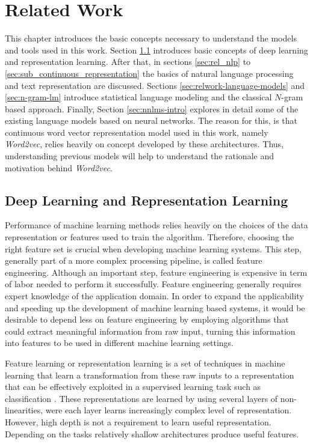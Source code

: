 
\chapter{Related Work}
\label{chap:related_work}

This chapter introduces the basic concepts necessary to understand the models
and tools  used in this work. Section \ref{sec:deep_learning} introduces
basic concepts of deep learning and representation learning. After that, in
sections  \ref{sec:rel_nlp} to \ref{sec:sub_continuous_representation}
the basics of natural language processing and text representation  are
discussed. Sections \ref{sec:relwork-language-models} and \ref{sec:n-gram-lm} introduce statistical
language modeling and the classical $N$-gram based approach. Finally,
Section \ref{sec:nnlms-intro} explores 
  in detail some of the existing language  models based
on neural networks. The reason for this, is that continuous word vector
representation model used in this work, namely \textit{Word2vec}, relies
heavily on concept developed by these architectures. Thus, understanding  previous models  will help to understand the rationale and
motivation behind \textit{Word2vec}. 
\section{Deep Learning and Representation Learning}
 \label{sec:deep_learning}
Performance of machine learning methods relies heavily on the choices of the
data representation or features used to train the algorithm. Therefore,
choosing the right feature set is crucial when developing  machine learning
 systems. This step, generally part of a more complex processing
pipeline, is called feature engineering.
Although an important step, feature engineering is expensive in term of labor needed
to perform it successfully. Feature engineering generally requires   expert
knowledge of the application domain.  In order to expand the applicability
and speeding up the development of machine learning based systems, it would
be desirable to 
depend less on feature engineering by employing algorithms  that could extract
meaningful  information from raw input, turning this information into
features to be  used  in different machine learning settings.

Feature learning or representation learning is a set of techniques in machine
learning that learn a transformation from these raw inputs to a representation that
can be effectively exploited in a supervised learning task such as
classification \cite{DBLP:journals/corr/abs-1206-5538}. 
These representations  are learned by using several layers of
non-linearities, were each layer learns increasingly complex level of
representation.  However, high depth is
not a requirement to learn useful representation. Depending on the tasks
relatively shallow architectures produce useful features.

